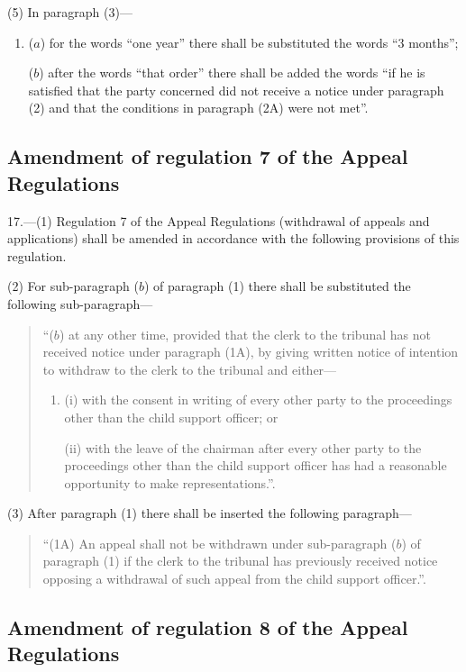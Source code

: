 \documentclass[12pt,a4paper]{article}
\begin{document}
(5) In paragraph (3)—
\begin{enumerate}\item[]
($a$) for the words “one year” there shall be substituted the words “3 months”;

($b$) after the words “that order” there shall be added the words “if he is satisfied that the party concerned did not receive a notice under paragraph (2) and that the conditions in paragraph (2A) were not met”.
\end{enumerate}

\subsection[17. Amendment of regulation 7 of the Appeal Regulations]{Amendment of regulation 7 of the Appeal Regulations}

17.—(1) Regulation 7 of the Appeal Regulations (withdrawal of appeals and applications) shall be amended in accordance with the following provisions of this regulation.

(2) For sub-paragraph ($b$) of paragraph (1) there shall be substituted the following sub-paragraph—
\begin{quotation}
“($b$) at any other time, provided that the clerk to the tribunal has not received notice under paragraph (1A), by giving written notice of intention to withdraw to the clerk to the tribunal and either—
\begin{enumerate}\item[]
(i) with the consent in writing of every other party to the proceedings other than the child support officer; or

(ii) with the leave of the chairman after every other party to the proceedings other than the child support officer has had a reasonable opportunity to make representations.”.
\end{enumerate}
\end{quotation}

(3) After paragraph (1) there shall be inserted the following paragraph—
\begin{quotation}
“(1A) An appeal shall not be withdrawn under sub-\hspace{0pt}paragraph ($b$) of paragraph (1) if the clerk to the tribunal has previously received notice opposing a withdrawal of such appeal from the child support officer.”.
\end{quotation}

\subsection[18. Amendment of regulation 8 of the Appeal Regulations]{Amendment of regulation 8 of the Appeal Regulations}
\end{document}
